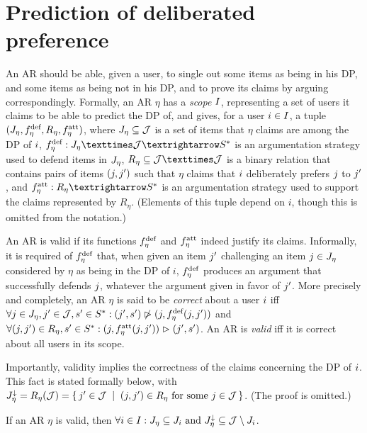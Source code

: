 \documentclass[french, english]{da2pl2018}
\begin{document}
\section{Prediction of deliberated preference}
\label{sec:pred}
An \ac{AR} should be able, given a user, to single out some items as being in his \ac{DP}, and some items as being not in his \ac{DP}, and to prove its claims by arguing correspondingly. 
Formally, an \ac{AR} $\eta$ has a \emph{scope} $I$, representing a set of users it claims to be able to predict the \ac{DP} of, and gives, for a user $i \in I$, a tuple $(J_{\eta}, f^\text{def}_{\eta}, R_\eta, f^\text{att}_{\eta})$, where $J_{\eta} \subseteq \mathcal{J}$ is a set of items that $\eta$ claims are among the \ac{DP} of $i$, $\mdef: \mitems × \allitems → \allargs$ is an argumentation strategy used to defend items in $J_{\eta}$, $R_\eta \subseteq \allitems × \allitems$ is a binary relation that contains pairs of items $(j, j')$ such that $\eta$ claims that $i$ deliberately prefers $j$ to $j'$, and $\matt: R_\eta → \allargs$ is an argumentation strategy used to support the claims represented by $R_\eta$. (Elements of this tuple depend on $i$, though this is omitted from the notation.)

An \ac{AR} is valid if its functions $f^\text{def}_{\eta}$ and $f^\text{att}_{\eta}$ indeed justify its claims. Informally, it is required of $f^\text{def}_{\eta}$ that, when given an item $j'$ challenging an item $j \in J_{\eta}$ considered by $\eta$ as being in the \ac{DP} of $i$, $f^\text{def}_{\eta}$ produces an argument that successfully defends $j$, whatever the argument given in favor of $j'$. More precisely and completely, an \ac{AR} $\eta$ is said to be \emph{correct} about a user $i$ iff $\forall j \in J_{\eta}, j' \in \mathcal{J}, s' \in S^*: (j', s') \not\vartriangleright (j, f^\text{def}_{\eta}(j, j'))$ and $\forall (j, j') \in R_\eta, s' \in S^*: (j, f^\text{att}_{\eta}(j, j')) \vartriangleright (j', s')$. An \ac{AR} is \emph{valid} iff it is correct about all users in its scope.

Importantly, validity implies the correctness of the claims concerning the \ac{DP} of $i$. This fact is stated formally below, with $\mnitems = R_\eta(\allitems) = \set{\itm' \in \allitems \suchthat (\itm, \itm') \in R_\eta \text{ for some } \itm \in \allitems}$. (The proof is omitted.)
\begin{fact}
	If an \ac{AR} $\eta$ is valid, then $\forall i \in I: J_{\eta} \subseteq J_i \text{ and } J^\downarrow_{\eta} \subseteq \mathcal{J} \setminus J_i$.
\end{fact}
\end{document}

